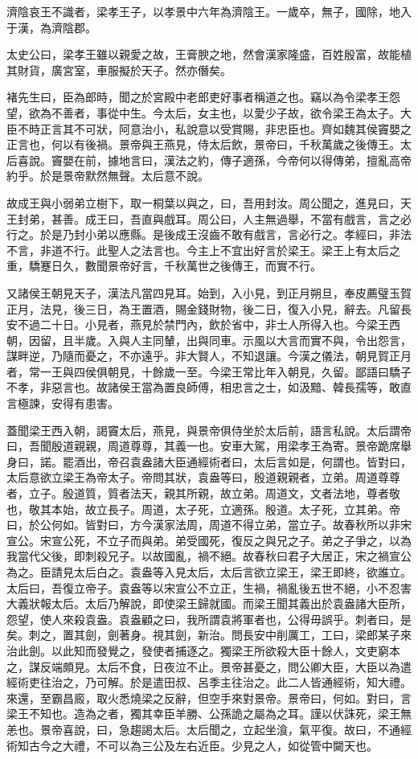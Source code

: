 濟陰哀王不識者，梁孝王子，以孝景中六年為濟陰王。一歲卒，無子，國除，地入于漢，為濟陰郡。

太史公曰，梁孝王雖以親愛之故，王膏腴之地，然會漢家隆盛，百姓殷富，故能植其財貨，廣宮室，車服擬於天子。然亦僭矣。

褚先生曰，臣為郎時，聞之於宮殿中老郎吏好事者稱道之也。竊以為令梁孝王怨望，欲為不善者，事從中生。今太后，女主也，以愛少子故，欲令梁王為太子。大臣不時正言其不可狀，阿意治小，私說意以受賞賜，非忠臣也。齊如魏其侯竇嬰之正言也，何以有後禍。景帝與王燕見，侍太后飲，景帝曰，千秋萬歲之後傳王。太后喜說。竇嬰在前，據地言曰，漢法之約，傳子適孫，今帝何以得傳弟，擅亂高帝約乎。於是景帝默然無聲。太后意不說。

故成王與小弱弟立樹下，取一桐葉以與之，曰，吾用封汝。周公聞之，進見曰，天王封弟，甚善。成王曰，吾直與戲耳。周公曰，人主無過舉，不當有戲言，言之必行之。於是乃封小弟以應縣。是後成王沒齒不敢有戲言，言必行之。孝經曰，非法不言，非道不行。此聖人之法言也。今主上不宜出好言於梁王。梁王上有太后之重，驕蹇日久，數聞景帝好言，千秋萬世之後傳王，而實不行。

又諸侯王朝見天子，漢法凡當四見耳。始到，入小見，到正月朔旦，奉皮薦璧玉賀正月，法見，後三日，為王置酒，賜金錢財物，後二日，復入小見，辭去。凡留長安不過二十日。小見者，燕見於禁門內，飲於省中，非士人所得入也。今梁王西朝，因留，且半歲。入與人主同輦，出與同車。示風以大言而實不與，令出怨言，謀畔逆，乃隨而憂之，不亦遠乎。非大賢人，不知退讓。今漢之儀法，朝見賀正月者，常一王與四侯俱朝見，十餘歲一至。今梁王常比年入朝見，久留。鄙語曰驕子不孝，非惡言也。故諸侯王當為置良師傅，相忠言之士，如汲黯、韓長孺等，敢直言極諫，安得有患害。

蓋聞梁王西入朝，謁竇太后，燕見，與景帝俱侍坐於太后前，語言私說。太后謂帝曰，吾聞殷道親親，周道尊尊，其義一也。安車大駕，用梁孝王為寄。景帝跪席舉身曰，諾。罷酒出，帝召袁盎諸大臣通經術者曰，太后言如是，何謂也。皆對曰，太后意欲立梁王為帝太子。帝問其狀，袁盎等曰，殷道親親者，立弟。周道尊尊者，立子。殷道質，質者法天，親其所親，故立弟。周道文，文者法地，尊者敬也，敬其本始，故立長子。周道，太子死，立適孫。殷道。太子死，立其弟。帝曰，於公何如。皆對曰，方今漢家法周，周道不得立弟，當立子。故春秋所以非宋宣公。宋宣公死，不立子而與弟。弟受國死，復反之與兄之子。弟之子爭之，以為我當代父後，即刺殺兄子。以故國亂，禍不絕。故春秋曰君子大居正，宋之禍宣公為之。臣請見太后白之。袁盎等入見太后，太后言欲立梁王，梁王即終，欲誰立。太后曰，吾復立帝子。袁盎等以宋宣公不立正，生禍，禍亂後五世不絕，小不忍害大義狀報太后。太后乃解說，即使梁王歸就國。而梁王聞其義出於袁盎諸大臣所，怨望，使人來殺袁盎。袁盎顧之曰，我所謂袁將軍者也，公得毋誤乎。刺者曰，是矣。刺之，置其劍，劍著身。視其劍，新治。問長安中削厲工，工曰，梁郎某子來治此劍。以此知而發覺之，發使者捕逐之。獨梁王所欲殺大臣十餘人，文吏窮本之，謀反端頗見。太后不食，日夜泣不止。景帝甚憂之，問公卿大臣，大臣以為遣經術吏往治之，乃可解。於是遣田叔、呂季主往治之。此二人皆通經術，知大禮。來還，至霸昌廄，取火悉燒梁之反辭，但空手來對景帝。景帝曰，何如。對曰，言梁王不知也。造為之者，獨其幸臣羊勝、公孫詭之屬為之耳。謹以伏誅死，梁王無恙也。景帝喜說，曰，急趨謁太后。太后聞之，立起坐湌，氣平復。故曰，不通經術知古今之大禮，不可以為三公及左右近臣。少見之人，如從管中闚天也。